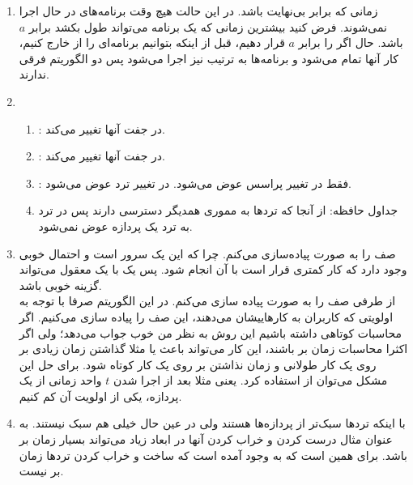 \begin{enumerate}
    \item زمانی که
    برابر بی‌نهایت باشد. در این حالت هیچ وقت برنامه‌های در حال اجرا
    نمی‌شوند. فرض کنید بیشترین زمانی که یک برنامه می‌تواند طول بکشد برابر 
    $a$
    باشد. حال اگر
    را برابر
    $a$
    قرار دهیم، قبل از اینکه بتوانیم برنامه‌ای را از
    خارج کنیم، کار آنها تمام می‌شود و برنامه‌‌ها به ترتیب نیز اجرا می‌شود پس دو الگوریتم فرقی ندارند.
    \item
    \begin{enumerate}
        \item {}: در جفت آنها تغییر می‌کند.
        \item {}: در جفت آنها تغییر می‌کند.
        \item {}: فقط در تغییر پراسس عوض می‌شود. در تغییر ترد
        عوض می‌شود.
        \item جداول حافظه: از آنجا که ترد‌ها به مموری همدیگر دسترسی دارند پس در
        ترد به ترد یک پردازه عوض نمی‌شود.
    \end{enumerate}
    \item صف
    را به صورت
    پیاده‌سازی می‌کنم. چرا که این یک سرور است و احتمال خوبی وجود دارد که کار
    کمتری قرار است با آن انجام ‌شود. پس یک
    با یک
    معقول می‌تواند گزینه خوبی باشد.
    \\
    از طرفی صف
    را به صورت
    پیاده سازی می‌کنم. در این الگوریتم صرفا با توجه به اولویتی که کاربران به کار‌هاییشان می‌دهند،
    این صف را پیاده سازی می‌کنیم.
    اگر محاسبات کوتاهی داشته باشیم این روش به نظر من خوب جواب می‌دهد؛ ولی اگر اکثرا محاسبات زمان بر
    باشند، این کار می‌تواند باعث
    یا مثلا گذاشتن زمان زیادی بر روی یک کار طولانی و زمان نذاشتن بر روی یک کار کوتاه شود.
    برای حل این مشکل می‌توان از
    استفاده کرد. یعنی مثلا بعد از اجرا شدن
    $t$
    واحد زمانی از یک پردازه، یکی از اولویت آن کم کنیم.
    \item با اینکه تردها سبک‌تر از پردازه‌ها هستند ولی در عین حال خیلی هم سبک نیستند. به عنوان مثال
    درست کردن و خراب کردن آنها در ابعاد زیاد می‌تواند بسیار زمان بر باشد. برای همین است که
    به وجود آمده است که ساخت و خراب کردن ترد‌ها زمان بر نیست.

\end{enumerate}
